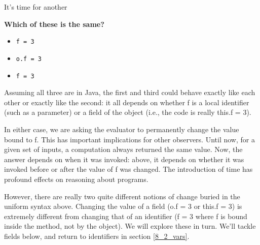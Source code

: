 \secdown

It’s time for another

\bigskip
\textbf{Which of these is the same?}
\begin{itemize}
  \item \verb|f = 3|
  \item \verb|o.f = 3|
  \item \verb|f = 3|
\end{itemize}

Assuming all three are in Java, the first and third could behave exactly like
each other or exactly like the second: it all depends on whether f is a local
identifier (such as a parameter) or a field of the object (i.e., the code is
really this.f = 3).

In either case, we are asking the evaluator to permanently change the value
bound to f. This has important implications for other observers. Until now, for
a given set of inputs, a computation always returned the same value. Now, the
answer depends on when it was invoked: above, it depends on whether it was
invoked before or after the value of f was changed. The introduction of time has
profound effects on reasoning about programs.

However, there are really two quite different notions of change buried in the
uniform syntax above. Changing the value of a field (o.f = 3 or this.f = 3) is
extremely different from changing that of an identifier (f = 3 where f is bound
inside the method, not by the object). We will explore these in turn. We’ll
tackle fields below, and return to identifiers in section \ref{8_2_vars}.





\secup

